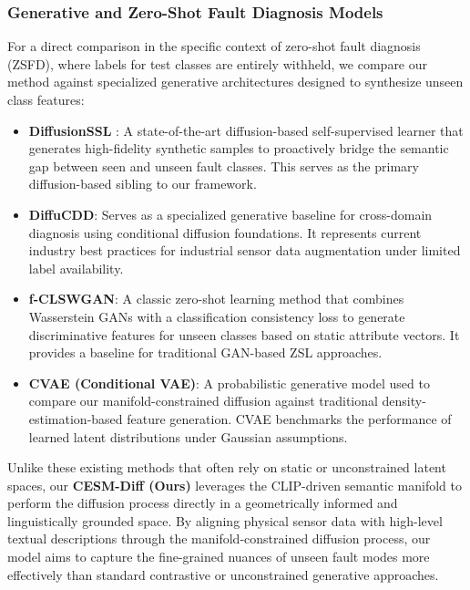 \subsubsection{Generative and Zero-Shot Fault Diagnosis Models}
For a direct comparison in the specific context of zero-shot fault diagnosis (ZSFD), where labels for test classes are entirely withheld, we compare our method against specialized generative architectures designed to synthesize unseen class features:
\begin{itemize}
    \item \textbf{DiffusionSSL} \cite{li2023diffusionssl}: A state-of-the-art diffusion-based self-supervised learner that generates high-fidelity synthetic samples to proactively bridge the semantic gap between seen and unseen fault classes. This serves as the primary diffusion-based sibling to our framework.
    \item \textbf{DiffuCDD}: Serves as a specialized generative baseline for cross-domain diagnosis using conditional diffusion foundations. It represents current industry best practices for industrial sensor data augmentation under limited label availability.
    \item \textbf{f-CLSWGAN}: A classic zero-shot learning method that combines Wasserstein GANs with a classification consistency loss to generate discriminative features for unseen classes based on static attribute vectors. It provides a baseline for traditional GAN-based ZSL approaches.
    \item \textbf{CVAE (Conditional VAE)}: A probabilistic generative model used to compare our manifold-constrained diffusion against traditional density-estimation-based feature generation. CVAE benchmarks the performance of learned latent distributions under Gaussian assumptions.
\end{itemize}

Unlike these existing methods that often rely on static or unconstrained latent spaces, our \textbf{CESM-Diff (Ours)} leverages the CLIP-driven semantic manifold to perform the diffusion process directly in a geometrically informed and linguistically grounded space. By aligning physical sensor data with high-level textual descriptions through the manifold-constrained diffusion process, our model aims to capture the fine-grained nuances of unseen fault modes more effectively than standard contrastive or unconstrained generative approaches.

